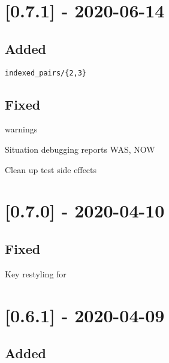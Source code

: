 \section{[0.7.1] - 2020-06-14}

\subsection{Added}

\begin{shortlist}
    \item \verb$indexed_pairs/{2,3}$
    \item {}
    \item {}
    \item {}
\end{shortlist}

\subsection{Fixed}

\begin{shortlist}
    \item {} warnings
    \item Situation debugging reports WAS, NOW
    \item Clean up test side effects
\end{shortlist}

\section{[0.7.0] - 2020-04-10}

\subsection{Fixed}

\begin{shortlist}
    \item Key restyling for 
\end{shortlist}

\section{[0.6.1] - 2020-04-09}

\subsection{Added}

